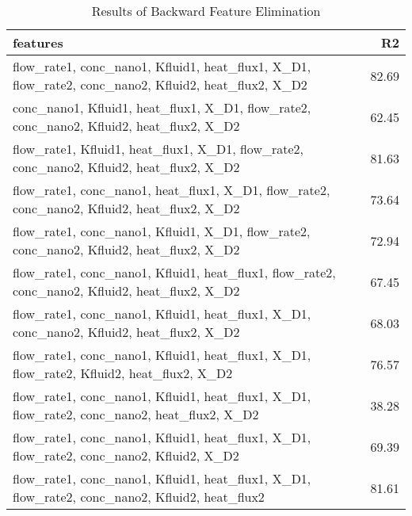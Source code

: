 
    \begin{table*}
        \centering
        \begin{tabular}{lr}
\hline
 features                                                                                                     &    R2 \\
\hline
 flow\_rate1, conc\_nano1, Kfluid1, heat\_flux1, X\_D1, flow\_rate2, conc\_nano2, Kfluid2, heat\_flux2, X\_D2 & 82.69 \\
 conc\_nano1, Kfluid1, heat\_flux1, X\_D1, flow\_rate2, conc\_nano2, Kfluid2, heat\_flux2, X\_D2              & 62.45 \\
 flow\_rate1, Kfluid1, heat\_flux1, X\_D1, flow\_rate2, conc\_nano2, Kfluid2, heat\_flux2, X\_D2              & 81.63 \\
 flow\_rate1, conc\_nano1, heat\_flux1, X\_D1, flow\_rate2, conc\_nano2, Kfluid2, heat\_flux2, X\_D2          & 73.64 \\
 flow\_rate1, conc\_nano1, Kfluid1, X\_D1, flow\_rate2, conc\_nano2, Kfluid2, heat\_flux2, X\_D2              & 72.94 \\
 flow\_rate1, conc\_nano1, Kfluid1, heat\_flux1, flow\_rate2, conc\_nano2, Kfluid2, heat\_flux2, X\_D2        & 67.45 \\
 flow\_rate1, conc\_nano1, Kfluid1, heat\_flux1, X\_D1, conc\_nano2, Kfluid2, heat\_flux2, X\_D2              & 68.03 \\
 flow\_rate1, conc\_nano1, Kfluid1, heat\_flux1, X\_D1, flow\_rate2, Kfluid2, heat\_flux2, X\_D2              & 76.57 \\
 flow\_rate1, conc\_nano1, Kfluid1, heat\_flux1, X\_D1, flow\_rate2, conc\_nano2, heat\_flux2, X\_D2          & 38.28 \\
 flow\_rate1, conc\_nano1, Kfluid1, heat\_flux1, X\_D1, flow\_rate2, conc\_nano2, Kfluid2, X\_D2              & 69.39 \\
 flow\_rate1, conc\_nano1, Kfluid1, heat\_flux1, X\_D1, flow\_rate2, conc\_nano2, Kfluid2, heat\_flux2        & 81.61 \\
\hline
\end{tabular}
        \caption{Results of Backward Feature Elimination}
        \label{backward}
    \end{table*}
    
